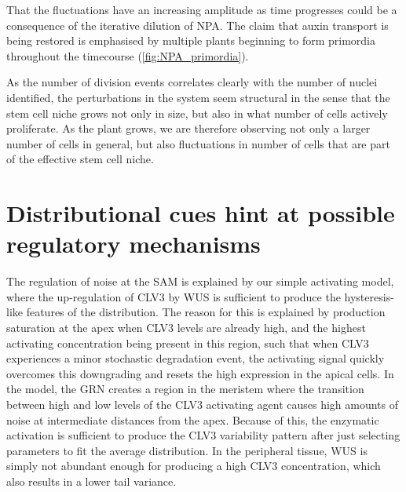That the fluctuations have an increasing amplitude as time progresses could be a
consequence of the iterative dilution of NPA. The claim that auxin transport is
being restored is emphasised by multiple plants beginning to form primordia throughout
the timecourse (\cref{fig:NPA_primordia}).

As the number of division events correlates clearly with the number of nuclei
identified, the perturbations in the system seem structural in the sense that
the stem cell niche grows not only in size, but also in what number of cells
actively proliferate. As the plant grows, we are therefore observing not only a
larger number of cells in general, but also fluctuations in number of cells that are
part of the effective stem cell niche.

\section{Distributional cues hint at possible regulatory mechanisms}
The regulation of noise at the SAM is explained by our simple activating model,
where the up-regulation of CLV3 by WUS is sufficient to produce the
hysteresis-like features of the distribution. The reason for this is explained
by production saturation at the apex when CLV3 levels are already high, and the
highest activating concentration being present in this region, such that when
CLV3 experiences a minor stochastic degradation event, the activating signal
quickly overcomes this downgrading and resets the high expression in the apical
cells. In the model, the GRN creates a
region in the meristem where the transition between high and low levels of the
CLV3 activating agent causes high amounts of noise at intermediate distances from the apex. Because of
this, the enzymatic activation is sufficient to produce the CLV3 variability
pattern after just selecting parameters to fit the average distribution.
In the peripheral tissue, WUS is simply not abundant enough for producing a
high CLV3 concentration, which also results in a lower tail variance. 

